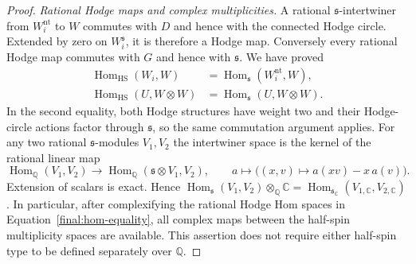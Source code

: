 \documentclass[11pt]{amsart}
\newcommand{\Q}{\mathbb Q}
\newcommand{\C}{\mathbb C}
\DeclareMathOperator{\Hom}{Hom}
\theoremstyle{definition}
\theoremstyle{remark}
\numberwithin{equation}{section}
\begin{document}
\begin{proof}
\emph{Rational Hodge maps and complex multiplicities.}
A rational $\mathfrak s$-intertwiner from $W_i^{\mathrm{nt}}$ to $W$
commutes with $D$ and hence with the connected Hodge circle.  Extended
by zero on $W_i^{\mathfrak s}$, it is therefore a Hodge map.
Conversely every rational Hodge map commutes with $G$ and hence with
$\mathfrak s$.  We have proved
\begin{equation}\label{final:hom-equality}
 \begin{aligned}
 \Hom_{\mathrm{HS}}(W_i,W)
   &=\Hom_{\mathfrak s}(W_i^{\mathrm{nt}},W),\\
 \Hom_{\mathrm{HS}}(U,W\otimes W)
   &=\Hom_{\mathfrak s}(U,W\otimes W).
 \end{aligned}
\end{equation}
In the second equality, both Hodge structures have weight two and
their Hodge-circle actions factor through $\mathfrak s$, so the
same commutation argument applies.  For any two rational
$\mathfrak s$-modules $V_1,V_2$ the intertwiner space is the kernel
of the rational linear map
\[
 \Hom_\Q(V_1,V_2)\longrightarrow
 \Hom_\Q(\mathfrak s\otimes V_1,V_2),\qquad
 a\longmapsto\bigl((x,v)\mapsto a(xv)-x\,a(v)\bigr).
\]
Extension of scalars is exact.  Hence
$\Hom_{\mathfrak s}(V_1,V_2)\otimes_\Q\C
=\Hom_{\mathfrak s_\C}(V_{1,\C},V_{2,\C})$.
In particular, after complexifying the rational Hodge Hom spaces in
Equation~\eqref{final:hom-equality}, all complex maps between the
half-spin multiplicity spaces are available.  This assertion does
not require either half-spin type to be defined separately over
$\Q$.


\end{proof}
\end{document}
